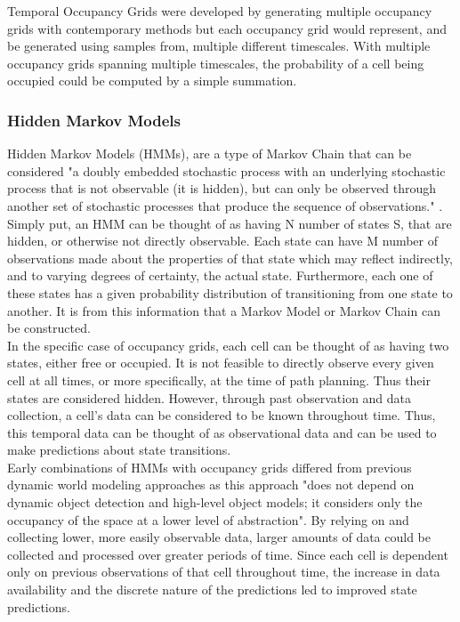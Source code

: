   Temporal Occupancy Grids were developed by generating multiple occupancy
  grids with contemporary methods but each occupancy grid
  would represent, and be generated using samples from, multiple different timescales.
  With multiple occupancy grids spanning multiple timescales, the
  probability of a cell being occupied could be computed by a simple summation. \\

  \subsubsection{ Hidden Markov Models }

  Hidden Markov Models (HMMs), are a type of Markov Chain that can be considered
  "a doubly embedded stochastic process with an underlying stochastic process
  that is not observable (it is hidden), but can only be observed through
  another set of stochastic processes that produce the sequence of observations."
  \cite{Rabiner1989}. Simply put, an HMM can be thought of as having N
  number of states S, that are hidden, or otherwise not directly observable.
  Each state can have M number of observations made about the properties of that state which
  may reflect indirectly, and to varying degrees of certainty, the actual state.
  Furthermore, each one of these states has a given probability distribution of
  transitioning from one state to another. It is from this information that a
  Markov Model or Markov Chain can be constructed. \\

  In the specific case of occupancy grids, each cell can be thought of as having two
  states, either free or occupied. It is not feasible to directly observe
  every given cell at all times, or more specifically, at the time of path planning.
  Thus their states are considered hidden. However, through past
  observation and data collection, a cell's data can be considered to be known
  throughout time. Thus, this temporal data can be thought of as observational data and
  can be used to make predictions about state transitions. \\

  Early combinations of HMMs with occupancy grids differed from previous dynamic
  world modeling approaches as this approach "does not depend on dynamic object
  detection and high-level object models; it considers only the occupancy of the
  space at a lower level of abstraction"\cite{Meyer-Delius2012}. By relying on
  and collecting lower, more easily observable data, larger amounts of data could
  be collected and processed over greater periods of time. Since each cell is
  dependent only on previous observations of that cell throughout time, the
  increase in data availability and the discrete nature of the predictions led to
  improved state predictions. \\

